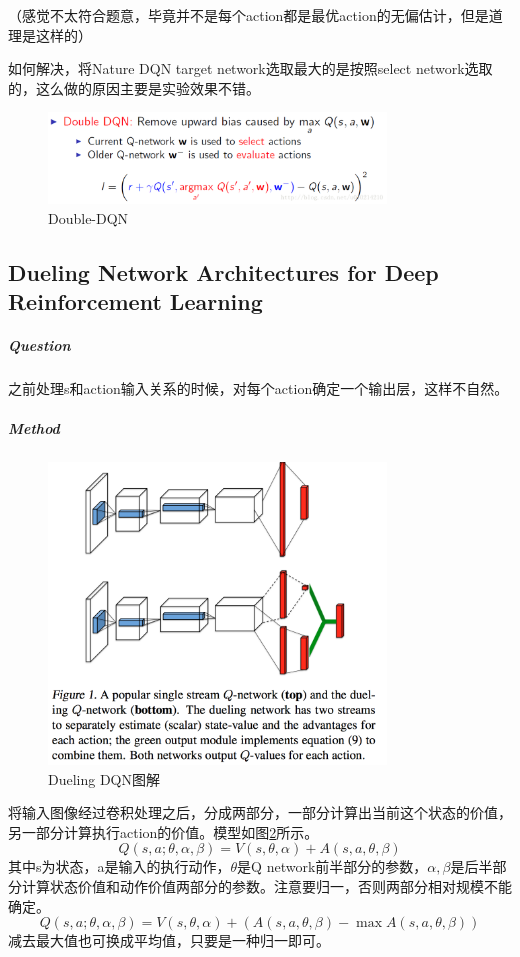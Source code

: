 \documentclass[a4paper]{article}
\begin{document}
（感觉不太符合题意，毕竟并不是每个action都是最优action的无偏估计，但是道理是这样的）

如何解决，将Nature DQN target network选取最大的是按照select network选取的，这么做的原因主要是实验效果不错。
\begin{figure}
\centering
\includegraphics[width=0.8\textwidth]{./img/28.png}
\caption{Double-DQN}
\label{fig:28}
\end{figure}

\subsection{Dueling Network Architectures for Deep Reinforcement Learning\cite{DBLP:journals/corr/WangFL15}}
\subparagraph{Question}
之前处理s和action输入关系的时候，对每个action确定一个输出层，这样不自然。
\subparagraph{Method}
\begin{figure}
\centering
\includegraphics[width=0.8\textwidth]{./img/29.png}
\caption{Dueling DQN图解}
\label{fig:29}
\end{figure}将输入图像经过卷积处理之后，分成两部分，一部分计算出当前这个状态的价值，另一部分计算执行action的价值。模型如图\ref{fig:29}所示。
$$Q(s,a;\theta,\alpha,\beta)=V(s,\theta, \alpha) + A(s,a,\theta,\beta)$$
其中s为状态，a是输入的执行动作，$\theta$是Q network前半部分的参数，$\alpha, \beta$是后半部分计算状态价值和动作价值两部分的参数。注意要归一，否则两部分相对规模不能确定。
$$Q(s,a;\theta,\alpha,\beta)=V(s,\theta, \alpha) + (A(s,a,\theta,\beta) - \max A(s,a,\theta,\beta))$$减去最大值也可换成平均值，只要是一种归一即可。




\end{document}

